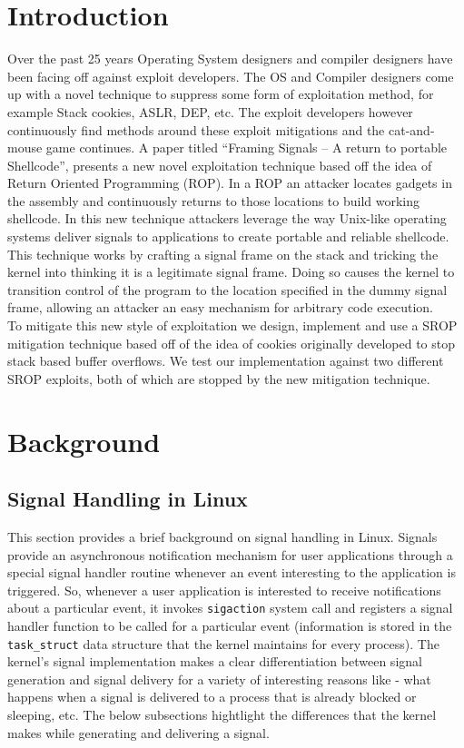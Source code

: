 \documentclass{sig-alternate-05-2015}
\begin{document}
\section{Introduction}
Over the past 25 years Operating System designers and compiler designers have been facing off against exploit developers. The OS and Compiler designers  come up with a novel technique to suppress some form of exploitation method, for example Stack cookies, ASLR, DEP, etc. The exploit developers however continuously find methods around these exploit mitigations and the cat-and-mouse game continues.  A paper titled “Framing Signals -- A return to portable Shellcode”,  presents a new novel exploitation technique based off the idea of Return Oriented Programming (ROP). In a ROP an attacker locates gadgets in the assembly and continuously returns to those locations to build working shellcode. In this new technique attackers leverage the way Unix-like operating systems deliver signals to applications to create portable and reliable shellcode. This technique works by crafting a signal frame on the stack and tricking the kernel into thinking it is a legitimate signal frame. Doing so causes the kernel to transition control of the program to the location specified in the dummy signal frame, allowing an attacker an easy mechanism for arbitrary code execution.\\
\indent
To mitigate this new style of exploitation we design, implement and use a SROP mitigation technique based off of the idea of cookies originally developed to stop stack based buffer overflows. We test our implementation against two different SROP exploits, both of which are stopped by the new mitigation technique.

\section {Background}
\subsection{Signal Handling in Linux}
This section provides a brief background on signal handling in Linux. Signals provide an asynchronous notification mechanism for user applications through a special signal handler routine whenever an event interesting to the application is triggered. So, whenever a user application is interested to receive notifications about a particular event, it invokes {\texttt{sigaction}} system call and registers a signal handler function to be called for a particular event (information is stored in the \texttt{task\_struct} data structure that the kernel maintains for every process). The kernel's signal implementation makes a clear differentiation between signal generation and signal delivery for a variety of interesting reasons like - what happens when a signal is delivered to a process that is already blocked or sleeping, etc. The below subsections hightlight the differences that the kernel makes while generating and delivering a signal.
\end{document}
